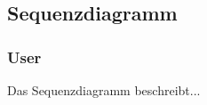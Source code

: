\newpage
\subsection{Sequenzdiagramm}
\subsubsection{User}
Das Sequenzdiagramm beschreibt...
\newpage